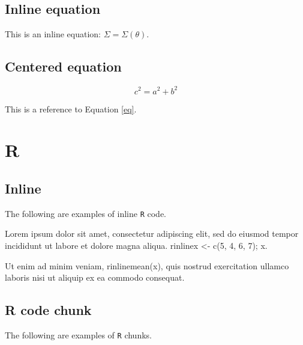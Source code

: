\documentclass[man]{apa7}
\begin{document}
\subsection{Inline equation}

This is an inline equation: $\Sigma = \Sigma \left( \theta \right)$.

\subsection{Centered equation}

\begin{equation}
\label{eq}
c^2 = a^2 + b^2
\end{equation}

This is a reference to Equation \ref{eq}.

\section{R}

\subsection{Inline}

The following are examples of inline \texttt{R} code.

Lorem ipsum dolor sit amet,
consectetur adipiscing elit,
sed do eiusmod tempor incididunt ut labore et dolore magna aliqua. rinline{x <- c(5, 4, 6, 7); x}.

Ut enim ad minim veniam, rinline{mean(x)},
quis nostrud exercitation ullamco laboris nisi ut aliquip ex ea commodo consequat.

\subsection{R code chunk}

The following are examples of \texttt{R} chunks.
\end{document}
